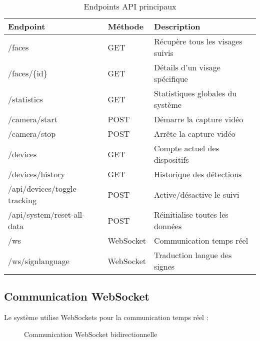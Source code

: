\documentclass[12pt,a4paper]{article}
\begin{document}
\begin{table}[H]
\centering
\footnotesize
\begin{tabular}{|l|l|p{5cm}|}
\hline
\rowcolor{lightblue}
\textbf{Endpoint} & \textbf{Méthode} & \textbf{Description} \\
\hline
/faces & GET & Récupère tous les visages suivis \\
\hline
/faces/\{id\} & GET & Détails d'un visage spécifique \\
\hline
/statistics & GET & Statistiques globales du système \\
\hline
/camera/start & POST & Démarre la capture vidéo \\
\hline
/camera/stop & POST & Arrête la capture vidéo \\
\hline
/devices & GET & Compte actuel des dispositifs \\
\hline
/devices/history & GET & Historique des détections \\
\hline
/api/devices/toggle-tracking & POST & Active/désactive le suivi \\
\hline
/api/system/reset-all-data & POST & Réinitialise toutes les données \\
\hline
/ws & WebSocket & Communication temps réel \\
\hline
/ws/signlanguage & WebSocket & Traduction langue des signes \\
\hline
\end{tabular}
\caption{Endpoints API principaux}
\end{table}

\subsection{Communication WebSocket}

Le système utilise WebSockets pour la communication temps réel :

\begin{figure}[H]
\centering
{}
\caption{Communication WebSocket bidirectionnelle}
\end{figure}
\end{document}
